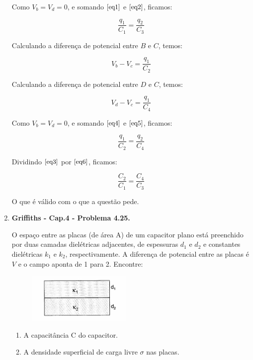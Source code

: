 \documentclass[11pt,a4paper]{article}
\begin{document}
\begin{enumerate}
Como $V_b = V_d = 0$, e somando $\ref{eq1}$ e $\ref{eq2}$, ficamos:

\begin{equation}
\displaystyle\dfrac{q_1}{C_1} = \displaystyle\dfrac{q_2}{C_3}
\label{eq3}
\end{equation}

Calculando a diferença de potencial entre $B$ e $C$, temos:

\begin{equation}
V_b - V_c = \displaystyle\dfrac{q_1}{C_2}
\label{eq4}
\end{equation}

Calculando a diferença de potencial entre $D$ e $C$, temos:

\begin{equation}
V_d - V_c = \displaystyle\dfrac{q_1}{C_4}
\label{eq5}
\end{equation}

Como $V_b = V_d = 0$, e somando $\ref{eq4}$ e $\ref{eq5}$, ficamos:

\begin{equation}
\displaystyle\dfrac{q_1}{C_2} = \displaystyle\dfrac{q_2}{C_4}
\label{eq6}
\end{equation}

Dividindo $\ref{eq3}$ por $\ref{eq6}$, ficamos:

$$\displaystyle\dfrac{C_2}{C_1} = \displaystyle\dfrac{C_4}{C_3}$$

O que é válido com o que a questão pede.

\item \textbf{Griffiths - Cap.4 - Problema 4.25.}

O espaço entre as placas (de área A) de um capacitor plano está preenchido por duas camadas dielétricas adjacentes, de espessuras $d_1$ e $d_2$ e constantes dielétricas $k_1$ e $k_2$, respectivamente. A diferença de potencial entre as placas é $V$ e o campo aponta de 1 para 2. Encontre:

\begin{figure}[h]	
\centering %
\includegraphics[width=5cm]{Selection_088.jpg} 
\end{figure}

\begin{enumerate}
\item A capacitância C do capacitor.
\item A densidade superficial de carga livre $\sigma$ nas placas.
\end{enumerate}


\end{enumerate}
\end{document}
